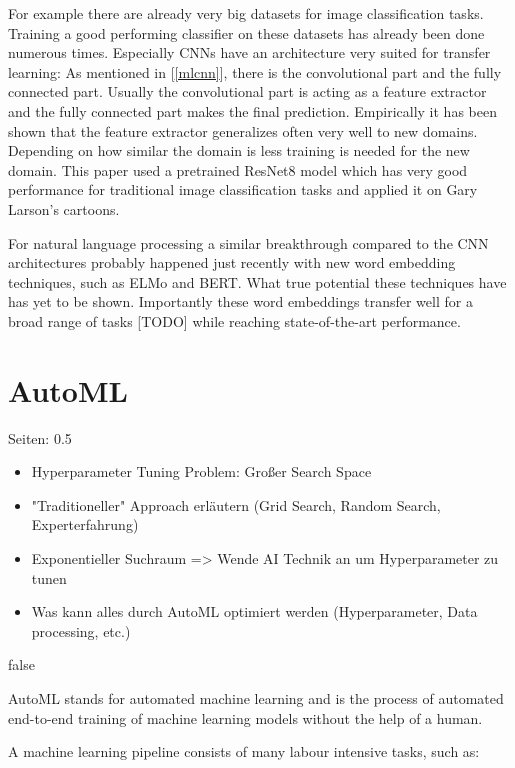 \documentclass[draft,final,oneside]{vutinfth} %
\begin{document}
For example there are already very big datasets for image classification tasks. Training a good performing classifier on these datasets has already been done numerous times. Especially CNNs have an architecture very suited for transfer learning: As mentioned in [\ref{mlcnn}], there is the convolutional part and the fully connected part. Usually the convolutional part is acting as a feature extractor and the fully connected part makes the final prediction. Empirically it has been shown that the feature extractor generalizes often very well to new domains. Depending on how similar the domain is less training is needed for the new domain. This paper used a pretrained ResNet8 model which has very good performance for traditional image classification tasks and applied it on Gary Larson's cartoons.

For natural language processing a similar breakthrough compared to the CNN architectures probably happened just recently with new word embedding techniques, such as ELMo and BERT. What true potential these techniques have has yet to be shown. Importantly these word embeddings transfer well for a broad range of tasks [TODO] while reaching state-of-the-art performance. 


\fi


\section{AutoML}
Seiten: 0.5

\begin{itemize}
\item Hyperparameter Tuning Problem: Großer Search Space
\item "Traditioneller" Approach erläutern (Grid Search, Random Search, Experterfahrung)
\item Exponentieller Suchraum => Wende AI Technik an um Hyperparameter zu tunen
\item Was kann alles durch AutoML optimiert werden (Hyperparameter, Data processing, etc.)
\end{itemize}

\if false

AutoML stands for automated machine learning and is the process of automated end-to-end training of machine learning models without the help of a human.

A machine learning pipeline consists of many labour intensive tasks, such as:
\end{document}

